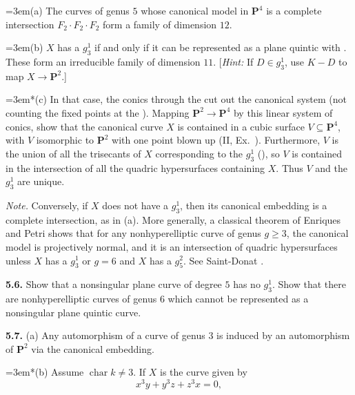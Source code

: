 {\noindent\hangindent=3em\hspace*{1.7em}(a) The curves of genus $5$ whose canonical model in $\mathbf P^4$ is a complete intersection $F_2\cdot F_2\cdot F_2$ form a family of dimension $12$.

\noindent\hangindent=3em\hspace*{1.7em}(b) $X$ has a $g_3^1$ if and only if it can be represented as a plane quintic with . These form an irreducible family of dimension $11$. [\emph{Hint:} If $D\in g_3^1$, use $K-D$ to map $X\to\mathbf P^2$.]

\noindent\hangindent=3em\hspace*{1.4em}*(c) In that case, the conics through the  cut out the canonical system (not counting the fixed points at the ). Mapping $\mathbf P^2\to\mathbf P^4$ by this linear system of conics, show that the canonical curve $X$ is contained in a cubic surface $V\subseteq\mathbf P^4$, with $V$ isomorphic to $\mathbf P^2$ with one point blown up (II, Ex.~). Furthermore, $V$ is the union of all the trisecants of $X$ corresponding to the $g_3^1$ (), so $V$ is contained in the intersection of all the quadric hypersurfaces containing $X$. Thus $V$ and the $g_3^1$ are unique.

\emph{Note.} Conversely, if $X$ does not have a $g_3^1$, then its canonical embedding is a complete intersection, as in (a). More generally, a classical theorem of Enriques and Petri shows that for any nonhyperelliptic curve of genus $g\ge3$, the canonical model is projectively normal, and it is an intersection of quadric hypersurfaces unless $X$ has a $g_3^1$ or $g=6$ and $X$ has a $g_5^2$. See Saint-Donat .

\smallskip
\noindent\hypertarget{ex-IV-5.6}{}\textbf{5.6.} Show that a nonsingular plane curve of degree $5$ has no $g_3^1$. Show that there are nonhyperelliptic curves of genus $6$ which cannot be represented as a nonsingular plane quintic curve.

\smallskip
\noindent\hypertarget{ex-IV-5.7}{}\textbf{5.7.} (a) Any automorphism of a curve of genus $3$ is induced by an automorphism of $\mathbf P^2$ via the canonical embedding.

\noindent\hangindent=3em\hspace*{1.4em}*(b) Assume $\operatorname{char}k\ne3$. If $X$ is the curve given by
\[
x^3y+y^3z+z^3x=0,
\]}
